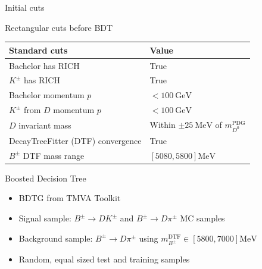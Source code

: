 \documentclass{beamer}
\begin{document}
\begin{frame}{Initial cuts}
  \begin{center}
    Rectangular cuts before BDT
  \end{center}
  \centering
  \def\arraystretch{1.2}%
  \begin{tabular}{|l|l|}
    \hline
    Standard cuts                     & Value \\
    \hline
    Bachelor has RICH                 & True \\
    $K^\pm$ has RICH                  & True \\
    Bachelor momentum $p$             & $< \SI{100}{\giga\eV}$ \\
    $K^\pm$ from $D$ momentum $p$     & $< \SI{100}{\giga\eV}$ \\
    $D$ invariant mass                & Within $\pm\SI{25}{\mega\eV}$ of $m_{D^0}^\text{PDG}$ \\
    DecayTreeFitter (DTF) convergence & True \\
    $B^\pm$ DTF mass range            & $[5080, 5800]\si{\mega\eV}$ \\
    \hline
  \end{tabular}
\end{frame}

\begin{frame}{Boosted Decision Tree}
  \begin{itemize}
    \setlength\itemsep{1.2em}
    \item{BDTG from TMVA Toolkit}
    \item{Signal sample: $B^\pm\to DK^\pm$ and $B^\pm\to D\pi^\pm$ MC samples}
    \item{Background sample: $B^\pm\to D\pi^\pm$ using $m_{B^\pm}^\text{DTF}\in[5800, 7000]\si{\mega\eV}$}
    \item{Random, equal sized test and training samples}
  \end{itemize}
\end{frame}
\end{document}
